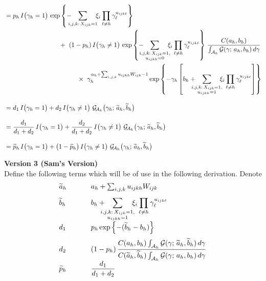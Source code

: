 \documentclass[11pt]{article}
\newcommand{\ind}{I}
\newcommand{\gammaExprNoH}{ -\hspace{3mm} \sum_{\mathclap{i,j,k{:}\, X_{ijk}=1}} \hspace{4mm} \xi_i \prod_{\ell \ne h} \gamma_\ell^{ u_{ijk\ell} } }
\newcommand{\gammaExprUisZero}{ \hspace{3mm} \sum_{\mathclap{\substack{i,j,k{:}\, X_{ijk}=1, \\ u_{ijkh} = 0}}} \hspace{4mm} \xi_i \prod_{\ell \ne h} \gamma_\ell^{ u_{ijk\ell} } }
\newcommand{\gammaExprUisOne}{ \hspace{3mm} \sum_{\mathclap{\substack{i,j,k{:}\, X_{ijk}=1, \\ u_{ijkh} = 1}}} \hspace{4mm} \xi_i \prod_{\ell \ne h} \gamma_\ell^{ u_{ijk\ell} } }
\begin{document}
\begin{enumerate}[label=Step \arabic*., leftmargin=13mm, itemsep=10mm]
\begin{align*}
&= p_h\, \ind\big( \gamma_h = 1 \big)\, \exp\left\{ \gammaExprNoH \right\} \\
& \hspace{30mm} +~ (1 - p_h)\, \ind\big(\gamma_h \ne 1 \big)\, \exp\left\{ -\gammaExprUisZero \right\}\, \frac{ C(a_h, b_h) }{ \int_{\mathcal{A}_h} \mathcal{G}(\gamma;\, a_h,b_h)\, d\gamma } \\
& \hspace{40mm} \times~ \gamma_h^{ \alpha_h + \sum_{i,j,k} u_{ijkh} W_{ijk} - 1 }\exp\left\{ -\gamma_h \left[ b_h + \gammaExprUisOne \right]\right\}  \\[2ex]
&= d_1\, \ind\big( \gamma_h = 1 \big) + d_2\, \ind\big( \gamma_h \ne 1 \big)~ \mathcal{G}_{\!\mathcal{A}_h} \big(\gamma_h;\, \widetilde{a}_h, \widetilde{b}_h\big) \\[2ex]
&= \frac{ d_1 }{ d_1 + d_2 }\, \ind\big( \gamma_h = 1 \big) + \frac{ d_2 }{ d_1 + d_2 }\, \ind\big( \gamma_h \ne 1 \big)~ \mathcal{G}_{\!\mathcal{A}_h} \big(\gamma_h;\, \widetilde{a}_h, \widetilde{b}_h\big) \\[2ex]
&= \widetilde{p}_h\, \ind\big( \gamma_h = 1 \big) + \big(1 - \widetilde{p}_h\big)\, \ind\big( \gamma_h \ne 1 \big)~ \mathcal{G}_{\!\mathcal{A}_h} \big(\gamma_h;\, \widetilde{a}_h, \widetilde{b}_h\big)
\end{align*} \vspace{15mm}





\textbf{Version 3 (Sam's Version)} \\[2ex]
Define the following terms which will be of use in the following derivation.  Denote
\[ \begin{array}{lll}
\widetilde{a}_h & & a_h + \sum_{i,j,k} u_{ijkh} W_{ijk} \\[2ex]
\widetilde{b}_h & & \displaystyle b_h + \gammaExprUisOne \\[4ex]
d_1 & \hspace{5mm} & p_h \exp\left\{ -(\widetilde{b}_h - b_h) \right\} \\[2ex]
d_2 &  & \displaystyle (1 - p_h)\, \frac{ C(a_h,b_h) \int_{\mathcal{A}_h} \mathcal{G}(\gamma;\, \widetilde{a}_h, \widetilde{b}_h)\, d\gamma }{ C(\widetilde{a}_h, \widetilde{b}_h) \int_{\mathcal{A}_h} \mathcal{G}(\gamma;\, a_h, b_h)\, d\gamma } \\[2ex]
\widetilde{p}_h & & \displaystyle \frac{ d_1 }{ d_1 + d_2 }
\end{array} \]


\end{enumerate}
\end{document}
